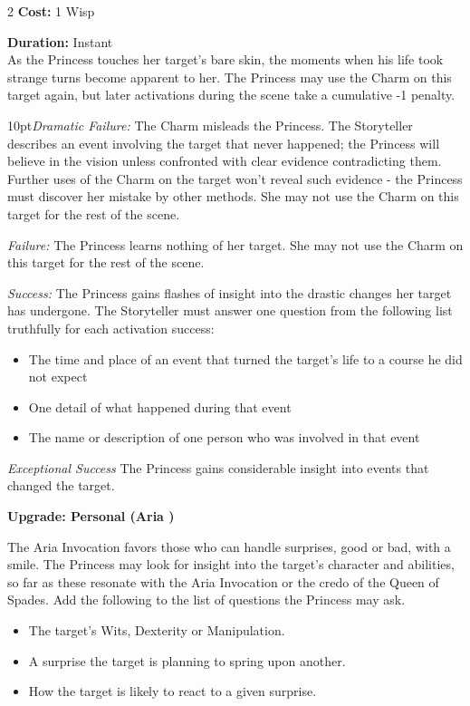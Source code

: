 \begin{multicols}{2}
\noindent \textbf{Cost:} 1 Wisp

\noindent \textbf{Duration:} Instant\\

\noindent As the Princess touches her target's bare skin, the moments when his life took strange turns become apparent to her. The Princess may use the Charm on this target again, but later activations during the scene take a cumulative -1 penalty.

\begin{myindentpar}{10pt}\emph{Dramatic Failure:} The Charm misleads the Princess. The Storyteller describes an event involving the target that never happened; the Princess will believe in the vision unless confronted with clear evidence contradicting them. Further uses of the Charm on the target won't reveal such evidence - the Princess must discover her mistake by other methods. She may not use the Charm on this target for the rest of the scene.

\emph{Failure:} The Princess learns nothing of her target. She may not use the Charm on this target for the rest of the scene.

\emph{Success:} The Princess gains flashes of insight into the drastic changes her target has undergone. The Storyteller must answer one question from the following list truthfully for each activation success:

\begin{itemize}
\item The time and place of an event that turned the target's life to a course he did not expect
\item One detail of what happened during that event
\item The name or description of one person who was involved in that event
\end{itemize}

\emph{Exceptional Success} The Princess gains considerable insight into events that changed the target.

\textbf{Upgrade: Personal (Aria \textbullet\textbullet)}

The Aria Invocation favors those who can handle surprises, good or bad, with a smile. The Princess may look for insight into the target's character and abilities, so far as these resonate with the Aria Invocation or the credo of the Queen of Spades. Add the following to the list of questions the Princess may ask.
\begin{itemize}
 \item The target's Wits, Dexterity or Manipulation.
 \item A surprise the target is planning to spring upon another. 
 \item How the target is likely to react to a given surprise.
\end{itemize}\end{myindentpar}


\end{multicols}
